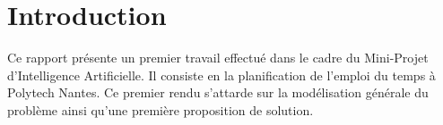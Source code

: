 \section{Introduction}

Ce rapport présente un premier travail effectué dans le cadre du Mini-Projet
d'Intelligence Artificielle.
Il consiste en la planification de l'emploi du temps à Polytech Nantes.
Ce premier rendu s'attarde sur la modélisation générale du problème ainsi qu'une
première proposition de solution.

